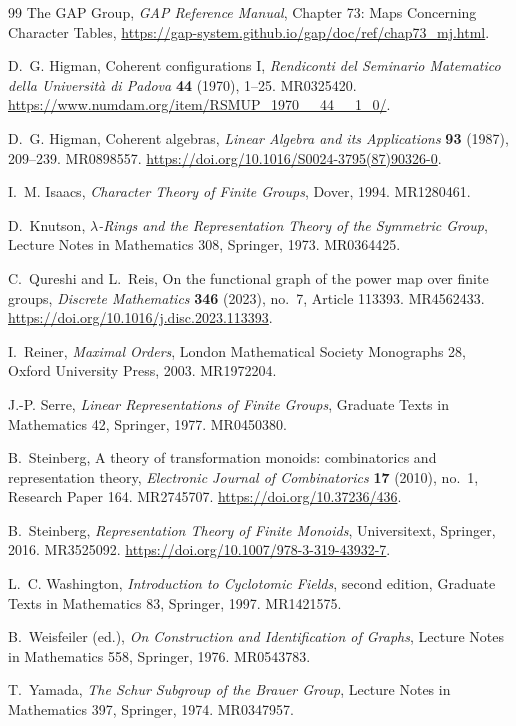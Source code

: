 \documentclass[11pt,reqno]{amsart}
\numberwithin{equation}{section}
\theoremstyle{remark}
\theoremstyle{plain}
\newcommand{\1}{\mathbf 1}
\begin{document}
\begin{thebibliography}{99}
The GAP Group,
\newblock \emph{GAP Reference Manual}, Chapter 73: Maps Concerning Character
Tables,
\newblock \url{https://gap-system.github.io/gap/doc/ref/chap73_mj.html}.

D.~G. Higman,
\newblock Coherent configurations I,
\newblock \emph{Rendiconti del Seminario Matematico della Universit\`a
di Padova} \textbf{44} (1970), 1--25.
\newblock MR0325420.
\newblock \url{https://www.numdam.org/item/RSMUP_1970__44__1_0/}.

D.~G. Higman,
\newblock Coherent algebras,
\newblock \emph{Linear Algebra and its Applications} \textbf{93} (1987),
209--239.
\newblock MR0898557.
\newblock \url{https://doi.org/10.1016/S0024-3795(87)90326-0}.

I.~M. Isaacs,
\newblock \emph{Character Theory of Finite Groups},
\newblock Dover, 1994.
\newblock MR1280461.

D.~Knutson,
\newblock \emph{\(\lambda\)-Rings and the Representation Theory of the
Symmetric Group},
\newblock Lecture Notes in Mathematics 308, Springer, 1973.
\newblock MR0364425.

C.~Qureshi and L.~Reis,
\newblock On the functional graph of the power map over finite groups,
\newblock \emph{Discrete Mathematics} \textbf{346} (2023), no.~7,
Article 113393.
\newblock MR4562433.
\newblock \url{https://doi.org/10.1016/j.disc.2023.113393}.

I.~Reiner,
\newblock \emph{Maximal Orders},
\newblock London Mathematical Society Monographs 28, Oxford University Press,
2003.
\newblock MR1972204.

J.-P. Serre,
\newblock \emph{Linear Representations of Finite Groups},
\newblock Graduate Texts in Mathematics 42, Springer, 1977.
\newblock MR0450380.

B.~Steinberg,
\newblock A theory of transformation monoids: combinatorics and
representation theory,
\newblock \emph{Electronic Journal of Combinatorics} \textbf{17}
(2010), no.~1, Research Paper 164.
\newblock MR2745707.
\newblock \url{https://doi.org/10.37236/436}.

B.~Steinberg,
\newblock \emph{Representation Theory of Finite Monoids},
\newblock Universitext, Springer, 2016.
\newblock MR3525092.
\newblock \url{https://doi.org/10.1007/978-3-319-43932-7}.

L.~C. Washington,
\newblock \emph{Introduction to Cyclotomic Fields},
\newblock second edition, Graduate Texts in Mathematics 83, Springer, 1997.
\newblock MR1421575.


B.~Weisfeiler (ed.),
\newblock \emph{On Construction and Identification of Graphs},
\newblock Lecture Notes in Mathematics 558, Springer, 1976.
\newblock MR0543783.

T.~Yamada,
\newblock \emph{The Schur Subgroup of the Brauer Group},
\newblock Lecture Notes in Mathematics 397, Springer, 1974.
\newblock MR0347957.

\end{thebibliography}
\end{document}

